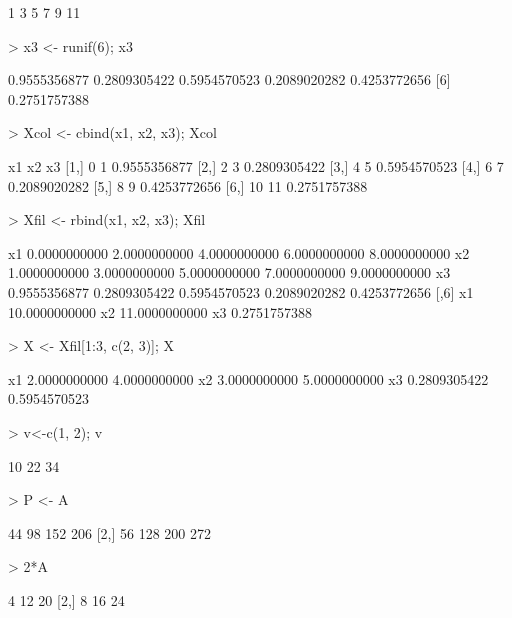 \documentclass{article}
\begin{document}
\begin{Schunk}
\begin{Soutput}
[1]  1  3  5  7  9 11
\end{Soutput}
\begin{Sinput}
> x3 <- runif(6); x3
\end{Sinput}
\begin{Soutput}
[1] 0.9555356877 0.2809305422 0.5954570523 0.2089020282 0.4253772656
[6] 0.2751757388
\end{Soutput}
\begin{Sinput}
> Xcol <- cbind(x1, x2, x3); Xcol
\end{Sinput}
\begin{Soutput}
     x1 x2           x3
[1,]  0  1 0.9555356877
[2,]  2  3 0.2809305422
[3,]  4  5 0.5954570523
[4,]  6  7 0.2089020282
[5,]  8  9 0.4253772656
[6,] 10 11 0.2751757388
\end{Soutput}
\begin{Sinput}
> Xfil <- rbind(x1, x2, x3); Xfil
\end{Sinput}
\begin{Soutput}
           [,1]         [,2]         [,3]         [,4]         [,5]
x1 0.0000000000 2.0000000000 4.0000000000 6.0000000000 8.0000000000
x2 1.0000000000 3.0000000000 5.0000000000 7.0000000000 9.0000000000
x3 0.9555356877 0.2809305422 0.5954570523 0.2089020282 0.4253772656
            [,6]
x1 10.0000000000
x2 11.0000000000
x3  0.2751757388
\end{Soutput}
\begin{Sinput}
> X <- Xfil[1:3, c(2, 3)]; X
\end{Sinput}
\begin{Soutput}
           [,1]         [,2]
x1 2.0000000000 4.0000000000
x2 3.0000000000 5.0000000000
x3 0.2809305422 0.5954570523
\end{Soutput}
\begin{Sinput}
> v<-c(1, 2); v %
\end{Sinput}
\begin{Soutput}
     [,1] [,2] [,3]
[1,]   10   22   34
\end{Soutput}
\begin{Sinput}
> P <- A %
\end{Sinput}
\begin{Soutput}
     [,1] [,2] [,3] [,4]
[1,]   44   98  152  206
[2,]   56  128  200  272
\end{Soutput}
\begin{Sinput}
> 2*A
\end{Sinput}
\begin{Soutput}
     [,1] [,2] [,3]
[1,]    4   12   20
[2,]    8   16   24
\end{Soutput}

\end{Schunk}
\end{document}
